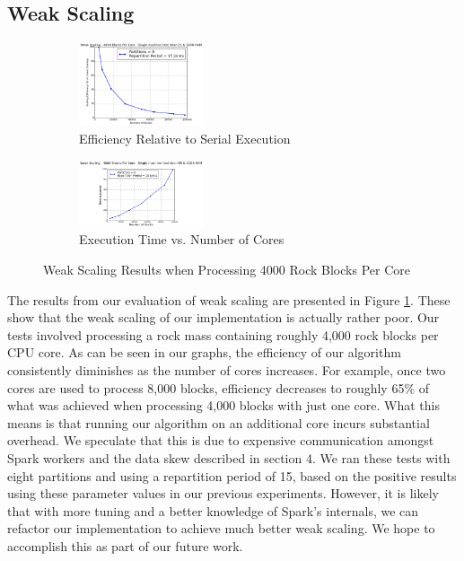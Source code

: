 \subsection{Weak Scaling}
\begin{figure}[t]
\centering
\begin{subfigure}{0.5\textwidth}
    \centering
    \includegraphics[width=0.4\textwidth]{weakScalingEfficiency.png}
    \caption{Efficiency Relative to Serial Execution}
\end{subfigure}%
\begin{subfigure}{0.5\textwidth}
    \centering
    \includegraphics[width=0.4\textwidth]{weakScalingTime.png}
    \caption{Execution Time vs. Number of Cores}
\end{subfigure}
\caption{Weak Scaling Results when Processing 4000 Rock Blocks Per Core}
\label{fig:weakScaling}
\end{figure}

The results from our evaluation of weak scaling are presented in Figure \ref{fig:weakScaling}. These show that the weak scaling of our implementation is actually rather poor. Our tests involved processing a rock mass containing roughly 4,000 rock blocks per CPU core. As can be seen in our graphs, the efficiency of our algorithm consistently diminishes as the number of cores increases. For example, once two cores are used to process 8,000 blocks, efficiency decreases to roughly 65\% of what was achieved when processing 4,000 blocks with just one core. What this means is that running our algorithm on an additional core incurs substantial overhead. We speculate that this is due to expensive communication amongst Spark workers and the data skew described in section 4. We ran these tests with eight partitions and using a repartition period of 15, based on the positive results using these parameter values in our previous experiments. However, it is likely that with more tuning and a better knowledge of Spark's internals, we can refactor our implementation to achieve much better weak scaling. We hope to accomplish this as part of our future work.

